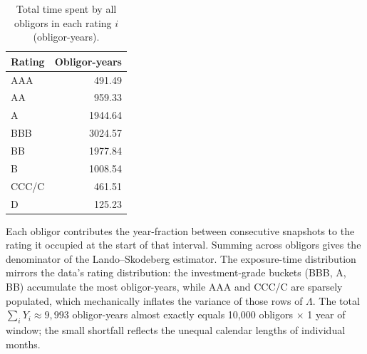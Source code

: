 \documentclass[
  11pt,
]{article}
\newenvironment{Shaded}{\begin{snugshade}}{\end{snugshade}}
\newcommand{\AttributeTok}[1]{\textcolor[rgb]{0.13,0.29,0.53}{#1}}
\newcommand{\CommentTok}[1]{\textcolor[rgb]{0.56,0.35,0.01}{\textit{#1}}}
\newcommand{\ConstantTok}[1]{\textcolor[rgb]{0.56,0.35,0.01}{#1}}
\newcommand{\DataTypeTok}[1]{\textcolor[rgb]{0.13,0.29,0.53}{#1}}
\newcommand{\DecValTok}[1]{\textcolor[rgb]{0.00,0.00,0.81}{#1}}
\newcommand{\FloatTok}[1]{\textcolor[rgb]{0.00,0.00,0.81}{#1}}
\newcommand{\FunctionTok}[1]{\textcolor[rgb]{0.13,0.29,0.53}{\textbf{#1}}}
\newcommand{\NormalTok}[1]{#1}
\newcommand{\OtherTok}[1]{\textcolor[rgb]{0.56,0.35,0.01}{#1}}
\newcommand{\SpecialCharTok}[1]{\textcolor[rgb]{0.81,0.36,0.00}{\textbf{#1}}}
\newcommand{\StringTok}[1]{\textcolor[rgb]{0.31,0.60,0.02}{#1}}
\begin{document}
\begin{Shaded}
\end{Shaded}

\begin{longtable}[t]{lr}
\caption{\label{tab:task1-Y-table}Total time spent by all obligors in each rating $i$ (obligor-years).}\\
\toprule
Rating & Obligor-years\\
\midrule
AAA & 491.49\\
AA & 959.33\\
A & 1944.64\\
BBB & 3024.57\\
BB & 1977.84\\
\addlinespace
B & 1008.54\\
CCC/C & 461.51\\
D & 125.23\\
\bottomrule
\end{longtable}

Each obligor contributes the year-fraction between consecutive snapshots
to the rating it occupied at the start of that interval. Summing across
obligors gives the denominator of the Lando--Skodeberg estimator. The
exposure-time distribution mirrors the data's rating distribution: the
investment-grade buckets (BBB, A, BB) accumulate the most obligor-years,
while AAA and CCC/C are sparsely populated, which mechanically inflates
the variance of those rows of \(\Lambda\). The total
\(\sum_i Y_i \approx 9{,}993\) obligor-years almost exactly equals
10,000 obligors \(\times\) 1 year of window; the small shortfall
reflects the unequal calendar lengths of individual months.
\end{document}
